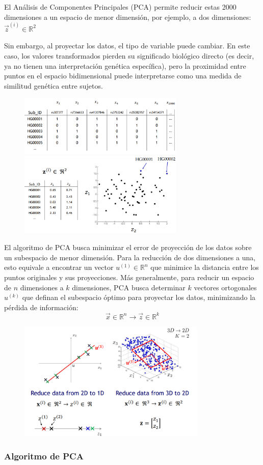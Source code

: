 El Análisis de Componentes Principales (PCA) permite reducir estas 2000 dimensiones a un espacio de menor dimensión, por ejemplo, a dos dimensiones: $\vec{z}^{(i)} \in \mathbb{R}^2$

Sin embargo, al proyectar los datos, el tipo de variable puede cambiar. En este caso, los valores transformados pierden su significado biológico directo (es decir, ya no tienen una interpretación genética específica), pero la proximidad entre puntos en el espacio bidimensional puede interpretarse como una medida de similitud genética entre sujetos.
\begin{figure}[h]
\centering
\includegraphics[width = 0.7\textwidth]{figs/gene-table1.png}
\includegraphics[width = 0.7\textwidth]{figs/gene-table2.png}
\end{figure}

El algoritmo de PCA busca minimizar el error de proyección de los datos sobre un subespacio de menor dimensión. Para la reducción de dos dimensiones a una, esto equivale a encontrar un vector $u^{(1)} \in \mathbb{R}^n$ que minimice la distancia entre los puntos originales y sus proyecciones. Más generalmente, para reducir un espacio de $n$ dimensiones a $k$ dimensiones, PCA busca determinar $k$ vectores ortogonales $u^{(k)}$ que definan el subespacio óptimo para proyectar los datos, minimizando la pérdida de información: 
$$\vec{x} \in \mathbb{R}^n \rightarrow \vec{z} \in \mathbb{R}^k$$

\begin{figure}[h]
\centering
\includegraphics[width = 0.8\textwidth]{figs/pca-dimensiones.png}
\end{figure}

\subsubsection{Algoritmo de PCA}